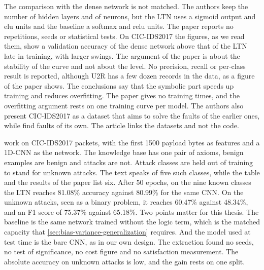 The comparison with the dense network is not matched. The authors keep the
number of hidden layers and of neurons, but the LTN uses a sigmoid output and
elu units and the baseline a softmax and relu units. The paper reports no
repetitions, seeds or statistical tests. On
CIC-IDS2017 the figures, as we read them, show a validation accuracy of the
dense network above that of the LTN late in training, with larger swings. The
argument of the paper is about the stability of the curve and not about the
level. No precision, recall or per-class result is reported, although U2R has a
few dozen records in the data, as a figure of the paper shows. The conclusions say that the symbolic part speeds
up training and reduces overfitting. The paper gives no training times, and the
overfitting argument rests on one training curve per model. The authors also present
CIC-IDS2017 as a dataset that aims to solve the faults of the earlier ones, while
\citet{engelen2021troubleshooting} find faults of its own. The article links the datasets and
not the code.

\citet{bizzarri2024nsaids} work on CIC-IDS2017 packets, with the first 1500
payload bytes as features and a 1D-CNN as the network. The knowledge base has one
pair of axioms, benign examples are benign and attacks are not. Attack classes
are held out of training to stand for unknown attacks. The text speaks of five
such classes, while the table and the results of the paper list six. After 50
epochs, on the nine known classes the LTN reaches 81.08\% accuracy against
80.99\% for the same CNN. On the
unknown attacks, seen as a binary problem, it reaches 60.47\% against 48.34\%,
and an F1 score of 75.37\% against 65.18\%. Two points matter for this thesis.
The baseline is the same network trained without the logic term, which is the
matched capacity that \cref{sec:bias-variance-generalization} requires. And the model
used at test time is the bare CNN, as in our own design. The extraction found
no seeds, no test of significance, no cost figure and no satisfaction
measurement. The absolute accuracy on unknown attacks is low, and the gain
rests on one split.

